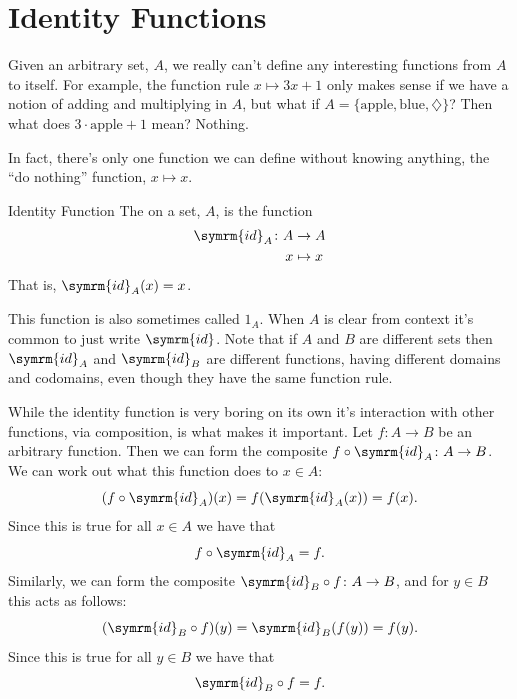 \documentclass[fleqn]{LectureClass/LectureClass}
\newcommand{\id}{\symrm{id}}
\begin{document}
    \section{Identity Functions}
    Given an arbitrary set, \(A\), we really can't define any interesting functions from \(A\) to itself.
    For example, the function rule \(x \mapsto 3x + 1\) only makes sense if we have a notion of adding and multiplying in \(A\), but what if \(A = \{\text{apple}, \text{blue}, \diamondsuit\}\)?
    Then what does \(3 \cdot \text{apple} + 1\) mean?
    Nothing.
    
    In fact, there's only one function we can define without knowing anything, the \enquote{do nothing} function, \(x \mapsto x\).
    
    \begin{dfn}{Identity Function}{}
        The  on a set, \(A\), is the function
        \begin{equation}
            \begin{aligned}
                \id_A \colon A &\to A\\
                x &\mapsto x
            \end{aligned}
        \end{equation}
        That is, \(\id_A(x) = x\).
    \end{dfn}
    
    This function is also sometimes called \(1_A\).
    When \(A\) is clear from context it's common to just write \(\id\).
    Note that if \(A\) and \(B\) are different sets then \(\id_A\) and \(\id_B\) are different functions, having different domains and codomains, even though they have the same function rule.
    
    While the identity function is very boring on its own it's interaction with other functions, via composition, is what makes it important.
    Let \(f \colon A \to B\) be an arbitrary function.
    Then we can form the composite \(f \circ \id_A \colon A \to B\).
    We can work out what this function does to \(x \in A\):
    \begin{equation}
        (f \circ \id_A)(x) = f(\id_A(x)) = f(x).
    \end{equation}
    Since this is true for all \(x \in A\) we have that
    \begin{equation}
        f \circ \id_A = f.
    \end{equation}
    Similarly, we can form the composite \(\id_B \circ f \colon A \to B\), and for \(y \in B\) this acts as follows:
    \begin{equation}
        (\id_B \circ f)(y) = \id_B(f(y)) = f(y).
    \end{equation}
    Since this is true for all \(y \in B\) we have that
    \begin{equation}
        \id_B \circ f = f.
    \end{equation}
    
\end{document}

